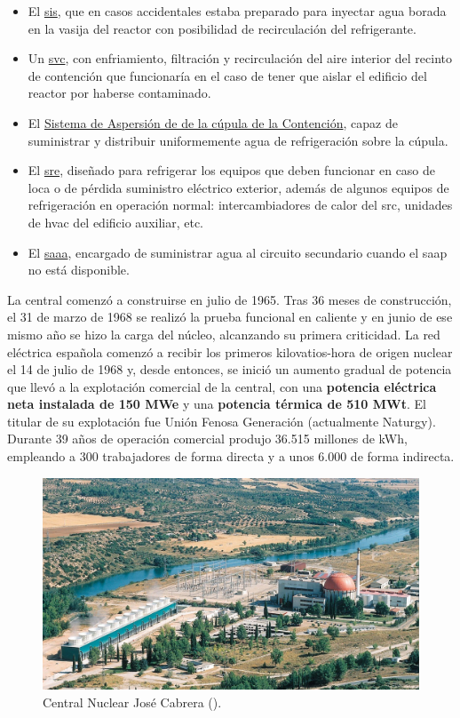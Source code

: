 \begin{itemize}
  \item El \underline{\acrlong{sis}}, que en casos accidentales estaba preparado para inyectar agua borada en la vasija del reactor con posibilidad de recirculación del refrigerante.
  \item Un \underline{\acrlong{svc}}, con enfriamiento, filtración y recirculación del aire interior del recinto de contención que funcionaría en el caso de tener que aislar el edificio del reactor por haberse contaminado.
  \item El \underline{Sistema de Aspersión de de la cúpula de la Contención}, capaz de suministrar y distribuir uniformemente agua de refrigeración sobre la cúpula.
  \item El \underline{\acrlong{sre}}, diseñado para refrigerar los equipos que deben funcionar en caso de \acrshort{loca} o de pérdida suministro eléctrico exterior, además de algunos equipos de refrigeración en operación normal: intercambiadores de calor del \acrlong{src}, unidades de \acrshort{hvac} del edificio auxiliar, etc.
  \item El \underline{\acrlong{saaa}}, encargado de suministrar agua al circuito secundario cuando el \acrlong{saap} no está disponible.
\end{itemize}

La central comenzó a construirse en julio de 1965. Tras 36 meses de construcción, el 31 de marzo de 1968 se realizó la prueba funcional en caliente y en junio de ese mismo año se hizo la carga del núcleo, alcanzando su primera criticidad. La red eléctrica española comenzó a recibir los primeros kilovatios-hora de origen nuclear el 14 de julio de 1968 y, desde entonces, se inició un aumento gradual de potencia que llevó a la explotación comercial de la central, con una \textbf{potencia eléctrica neta instalada de 150 MWe} y una \textbf{potencia térmica de 510 MWt}. El titular de su explotación fue Unión Fenosa Generación (actualmente Naturgy). Durante 39 años de operación comercial produjo 36.515 millones de kWh, empleando a 300 trabajadores de forma directa y a unos 6.000 de forma indirecta.

\begin{figure}[h]
    \centering
    \includegraphics[width=1\textwidth]{content/figures/zorita.jpg}
    \caption{Central Nuclear José Cabrera (\cite{sne_recursos_prensa}).}
    \label{fig:zorita}
\end{figure}

